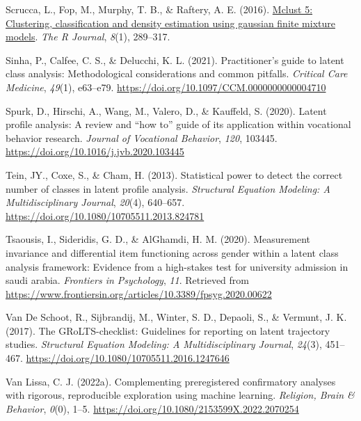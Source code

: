 \documentclass[
  ,man,floatsintext]{apa6}
\newlength{\cslhangindent}
\newlength{\cslentryspacingunit} %
\newenvironment{CSLReferences}[2] %
 {%
  \setlength{\parindent}{0pt}
  \ifodd #1
  \let\oldpar\par
  \def\par{\hangindent=\cslhangindent\oldpar}
  \fi
  \setlength{\parskip}{#2\cslentryspacingunit}
 }%
 {}
\begin{document}
\begin{CSLReferences}{1}{0}
\leavevmode{}%
Scrucca, L., Fop, M., Murphy, T. B., \& Raftery, A. E. (2016). \href{https://www.ncbi.nlm.nih.gov/pmc/articles/PMC5096736}{Mclust 5: Clustering, classification and density estimation using gaussian finite mixture models}. \emph{The R Journal}, \emph{8}(1), 289--317.

\leavevmode{}%
Sinha, P., Calfee, C. S., \& Delucchi, K. L. (2021). Practitioner's guide to latent class analysis: Methodological considerations and common pitfalls. \emph{Critical Care Medicine}, \emph{49}(1), e63--e79. \url{https://doi.org/10.1097/CCM.0000000000004710}

\leavevmode{}%
Spurk, D., Hirschi, A., Wang, M., Valero, D., \& Kauffeld, S. (2020). Latent profile analysis: A review and {``how to''} guide of its application within vocational behavior research. \emph{Journal of Vocational Behavior}, \emph{120}, 103445. \url{https://doi.org/10.1016/j.jvb.2020.103445}

\leavevmode{}%
Tein, JY., Coxe, S., \& Cham, H. (2013). Statistical power to detect the correct number of classes in latent profile analysis. \emph{Structural Equation Modeling: A Multidisciplinary Journal}, \emph{20}(4), 640--657. \url{https://doi.org/10.1080/10705511.2013.824781}

\leavevmode{}%
Tsaousis, I., Sideridis, G. D., \& AlGhamdi, H. M. (2020). Measurement invariance and differential item functioning across gender within a latent class analysis framework: Evidence from a high-stakes test for university admission in saudi arabia. \emph{Frontiers in Psychology}, \emph{11}. Retrieved from \url{https://www.frontiersin.org/articles/10.3389/fpsyg.2020.00622}

\leavevmode{}%
Van De Schoot, R., Sijbrandij, M., Winter, S. D., Depaoli, S., \& Vermunt, J. K. (2017). The {GRoLTS}-checklist: Guidelines for reporting on latent trajectory studies. \emph{Structural Equation Modeling: A Multidisciplinary Journal}, \emph{24}(3), 451--467. \url{https://doi.org/10.1080/10705511.2016.1247646}

\leavevmode{}%
Van Lissa, C. J. (2022a). Complementing preregistered confirmatory analyses with rigorous, reproducible exploration using machine learning. \emph{Religion, Brain \& Behavior}, \emph{0}(0), 1--5. \url{https://doi.org/10.1080/2153599X.2022.2070254}


\end{CSLReferences}
\end{document}
